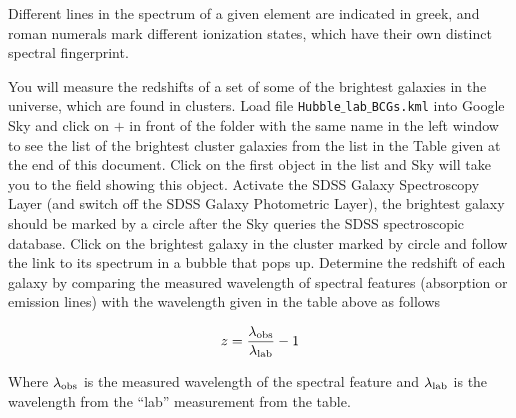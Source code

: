 \documentclass[12pt]{article}
\begin{document}
Different lines in the spectrum of a given element are indicated in
greek, and roman numerals mark different ionization states, which have
their own distinct spectral fingerprint.

You will measure the redshifts of a set of some of the brightest
galaxies in the universe, which are found in clusters. 
Load file {\tt Hubble$\_$lab$\_$BCGs.kml} into Google Sky and click
on $+$ in front of the folder with the same name in the left window to see 
the list of the brightest cluster galaxies from the list in the Table given
at the end of this document. Click on the first object in the list and Sky 
will take you to the field showing this object. Activate the SDSS Galaxy Spectroscopy
Layer (and switch off the SDSS Galaxy Photometric Layer), the brightest galaxy
should be marked by a circle after the Sky queries the SDSS spectroscopic database. 
Click on the brightest galaxy in the cluster marked by circle and
follow the link to its spectrum in a bubble that pops up.
Determine the redshift of each galaxy by comparing the measured
wavelength of spectral features (absorption or emission lines) with
the wavelength given in the table above as follows 

$$ z={\lambda_{\rm obs}\over\lambda_{\rm lab}}-1$$

Where $\lambda_{\rm obs}$ is the measured wavelength of the spectral
feature and $\lambda_{\rm lab}$ is the wavelength from the ``lab''
measurement from the table. 
\end{document}
